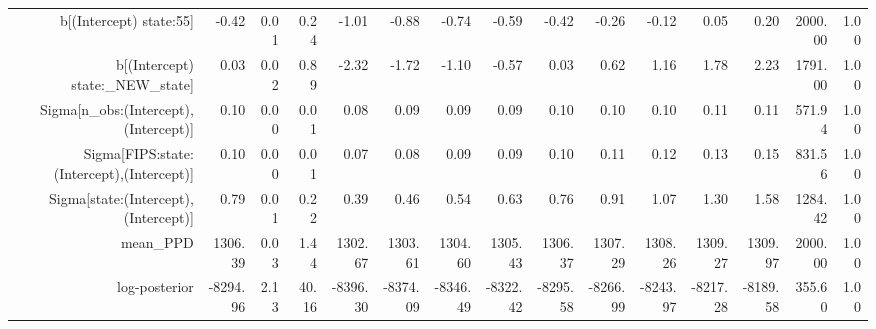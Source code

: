 \begin{table}[ht]
\begin{tabular}{rrrrrrrrrrrrrrr}
  b[(Intercept) state:55] & -0.42 & 0.01 & 0.24 & -1.01 & -0.88 & -0.74 & -0.59 & -0.42 & -0.26 & -0.12 & 0.05 & 0.20 & 2000.00 & 1.00 \\ 
  b[(Intercept) state:\_NEW\_state] & 0.03 & 0.02 & 0.89 & -2.32 & -1.72 & -1.10 & -0.57 & 0.03 & 0.62 & 1.16 & 1.78 & 2.23 & 1791.00 & 1.00 \\ 
  Sigma[n\_obs:(Intercept),(Intercept)] & 0.10 & 0.00 & 0.01 & 0.08 & 0.09 & 0.09 & 0.09 & 0.10 & 0.10 & 0.10 & 0.11 & 0.11 & 571.94 & 1.00 \\ 
  Sigma[FIPS:state:(Intercept),(Intercept)] & 0.10 & 0.00 & 0.01 & 0.07 & 0.08 & 0.09 & 0.09 & 0.10 & 0.11 & 0.12 & 0.13 & 0.15 & 831.56 & 1.00 \\ 
  Sigma[state:(Intercept),(Intercept)] & 0.79 & 0.01 & 0.22 & 0.39 & 0.46 & 0.54 & 0.63 & 0.76 & 0.91 & 1.07 & 1.30 & 1.58 & 1284.42 & 1.00 \\ 
  mean\_PPD & 1306.39 & 0.03 & 1.44 & 1302.67 & 1303.61 & 1304.60 & 1305.43 & 1306.37 & 1307.29 & 1308.26 & 1309.27 & 1309.97 & 2000.00 & 1.00 \\ 
  log-posterior & -8294.96 & 2.13 & 40.16 & -8396.30 & -8374.09 & -8346.49 & -8322.42 & -8295.58 & -8266.99 & -8243.97 & -8217.28 & -8189.58 & 355.60 & 1.00 \\ 
   \hline
\end{tabular}
\end{table}
